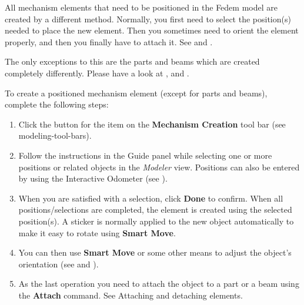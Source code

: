 All mechanism elements that need to be positioned in the Fedem model
are created by a different method. Normally,
you first need to select the position(s) needed to place the new element.
Then you sometimes need to orient the element properly,
and then you finally have to attach it. See
 and
.

The only exceptions to this are the parts and beams which are created
completely differently. Please have a look at
,
and .

To create a positioned mechanism element (except for parts and beams),
complete the following steps:

\begin{enumerate}
\item
  Click the button for the item on the \textbf{Mechanism Creation} tool bar
  (see 
  {modeling-tool-bars}).
\item
  Follow the instructions in the Guide panel while selecting one or more
  positions or related objects in the {\sl Modeler} view.
  Positions can also be entered by using the Interactive Odometer (see
  ).
\item
  When you are satisfied with a selection, click \textbf{Done} to confirm.
  When all positions/selections are completed, the element is created using the
  selected position(s). A sticker is normally applied to the new object
  automatically to make it easy to rotate using \textbf{Smart Move}.
\item
  You can then use \textbf{Smart Move} or some other means to adjust the
  object's orientation (see  and
  ).
\item
  As the last operation you need to attach the object to a part or a
  beam using the \textbf{Attach} command. See
             {Attaching and detaching elements}.
\end{enumerate}



